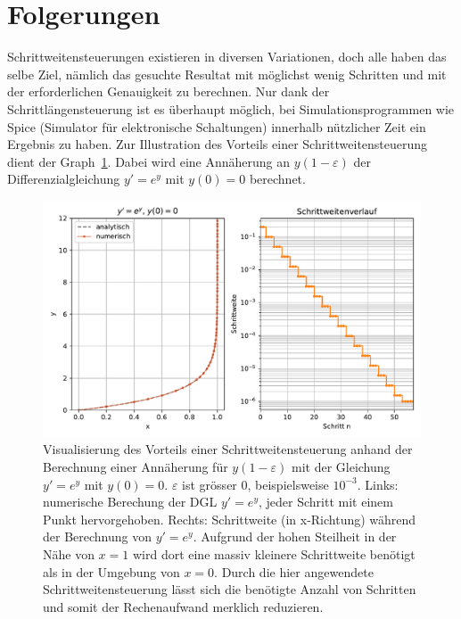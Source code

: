 %
%
%
\section{Folgerungen
\label{steps:section:folgerungen}}
Schrittweitensteuerungen existieren in diversen Variationen, doch alle haben das selbe Ziel, nämlich
das gesuchte Resultat mit möglichst wenig Schritten und mit der erforderlichen Genauigkeit zu berechnen.
Nur dank der Schrittlängensteuerung ist es überhaupt möglich, bei Simulationsprogrammen wie Spice (Simulator für elektronische Schaltungen)
innerhalb nützlicher Zeit ein Ergebnis zu haben. Zur Illustration des Vorteils einer Schrittweitensteuerung dient der Graph~\ref{buch:steps:beispielfuerssc}.
Dabei wird eine Annäherung an $y(1-\varepsilon)$ der Differenzialgleichung $y'=e^y$ mit $y(0)=0$ berechnet.

\begin{figure}
    \centering
    \includegraphics[width=\textwidth]{papers/steps/img/example_for_ssc.pdf}
    \caption{Visualisierung des Vorteils einer Schrittweitensteuerung anhand der Berechnung einer Annäherung für
    $y(1-\varepsilon)$ mit der Gleichung $y'=e^y$ mit $y(0)=0$.
    $\varepsilon$ ist grösser $0$, beispielsweise $10^{-3}$.
    Links: numerische Berechung der DGL $y'=e^y$, jeder Schritt mit einem Punkt hervorgehoben.
    Rechts: Schrittweite (in x-Richtung) während der Berechnung von $y'=e^y$.
    Aufgrund der hohen Steilheit in der Nähe von $x=1$ wird dort eine massiv kleinere Schrittweite benötigt
    als in der Umgebung von $x=0$. Durch die hier angewendete Schrittweitensteuerung lässt sich die benötigte
    Anzahl von Schritten und somit der Rechenaufwand merklich reduzieren.
    \label{buch:steps:beispielfuerssc}}
\end{figure}

